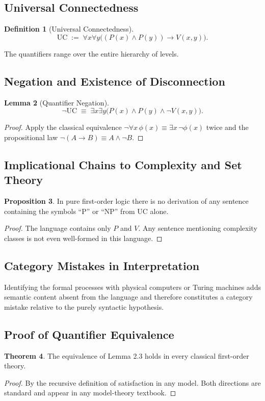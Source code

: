\documentclass[11pt,a4paper]{article}
\theoremstyle{definition}
\newtheorem{theorem}{Theorem}[section]
\newtheorem{lemma}[theorem]{Lemma}
\newtheorem{definition}[theorem]{Definition}
\newtheorem{proposition}[theorem]{Proposition}
\begin{document}
\subsection{Universal Connectedness}
\begin{definition}[Universal Connectedness]
\[
\mathrm{UC}\;:=\;\forall x\forall y\bigl((P(x)\land P(y))\to V(x,y)\bigr).
\]
\end{definition}
The quantifiers range over the entire hierarchy of levels.

\subsection{Negation and Existence of Disconnection}
\begin{lemma}[Quantifier Negation]
\[
\neg\mathrm{UC}\;\equiv\;\exists x\exists y\bigl(P(x)\land P(y)\land\neg V(x,y)\bigr).
\]
\end{lemma}
\begin{proof}
Apply the classical equivalence \(\neg\forall x\,\phi(x)\equiv\exists x\,\neg\phi(x)\) twice and the propositional law \(\neg(A\to B)\equiv A\land\neg B\).
\end{proof}

\subsection{Implicational Chains to Complexity and Set Theory}
\begin{proposition}
In pure first-order logic there is no derivation of any sentence containing the symbols “\(\mathrm{P}\)” or “\(\mathrm{NP}\)” from \(\mathrm{UC}\) alone.
\end{proposition}
\begin{proof}
The language contains only \(P\) and \(V\). Any sentence mentioning complexity classes is not even well-formed in this language.
\end{proof}

\subsection{Category Mistakes in Interpretation}
Identifying the formal processes with physical computers or Turing machines adds semantic content absent from the language and therefore constitutes a category mistake relative to the purely syntactic hypothesis.

\subsection{Proof of Quantifier Equivalence}
\begin{theorem}
The equivalence of Lemma 2.3 holds in every classical first-order theory.
\end{theorem}
\begin{proof}
By the recursive definition of satisfaction in any model. Both directions are standard and appear in any model-theory textbook.
\end{proof}
\end{document}
